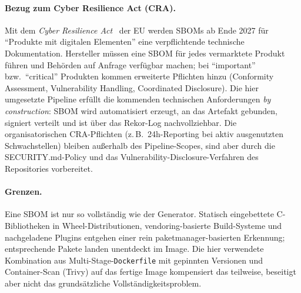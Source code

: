 \documentclass[12pt, a4paper]{scrartcl}
\begin{document}
\paragraph{Bezug zum Cyber Resilience Act (CRA).}
Mit dem \emph{Cyber Resilience Act}~\cite{cra} der EU werden SBOMs
ab Ende 2027 für \enquote{Produkte mit digitalen Elementen} eine
verpflichtende technische Dokumentation. Hersteller müssen eine SBOM
für jedes vermarktete Produkt führen und Behörden auf Anfrage
verfügbar machen; bei \enquote{important} bzw.\ \enquote{critical}
Produkten kommen erweiterte Pflichten hinzu (Conformity Assessment,
Vulnerability Handling, Coordinated Disclosure). Die hier umgesetzte
Pipeline erfüllt die kommenden technischen Anforderungen \emph{by
construction}: SBOM wird automatisiert erzeugt, an das Artefakt
gebunden, signiert verteilt und ist über das Rekor-Log
nachvollziehbar. Die organisatorischen CRA-Pflichten (z.\,B.\
24h-Reporting bei aktiv ausgenutzten Schwachstellen) bleiben außerhalb
des Pipeline-Scopes, sind aber durch die SECURITY.md-Policy und das
Vulnerability-Disclosure-Verfahren des Repositories vorbereitet.

\paragraph{Grenzen.}
Eine SBOM ist nur so vollständig wie der Generator. Statisch
eingebettete C-Bibliotheken in Wheel-Distributionen,
vendoring-basierte Build-Systeme und nachgeladene Plugins entgehen
einer rein paketmanager-basierten Erkennung; entsprechende Pakete
landen unentdeckt im Image. Die hier verwendete Kombination aus
Multi-Stage-\texttt{Dockerfile} mit gepinnten Versionen und
Container-Scan (Trivy) auf das fertige Image kompensiert das
teilweise, beseitigt aber nicht das grundsätzliche
Vollständigkeitsproblem.
\end{document}
